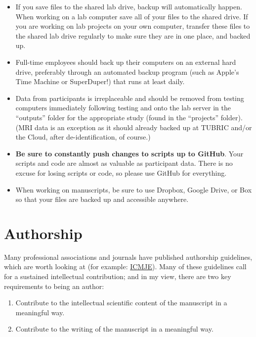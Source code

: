 \documentclass[letterpaper,12pt,oneside]{memoir}
\begin{document}
{\begin{itemize}
\item If you save files to the shared lab drive, backup will automatically happen. When working on a lab computer save all of your files to the shared drive. If you are working on lab projects on your own computer, transfer these files to the shared lab drive regularly to make sure they are in one place, and backed up.
\item Full-time employees should back up their computers on an external hard drive, preferably through an automated backup program (such as Apple's Time Machine or SuperDuper!) that runs at least daily.
\item Data from participants is irreplaceable and should be removed from testing computers immediately following testing and onto the lab server in the ``outputs'' folder for the appropriate study (found in the ``projects'' folder). (MRI data is an exception as it should already backed up at TUBRIC and/or the Cloud, after de-identification, of course.)
\item \textbf{Be sure to constantly push changes to scripts up to GitHub}. Your scripts and code are almost as valuable as participant data. There is no excuse for losing scripts or code, so please use GitHub for everything.
\item When working on manuscripts, be sure to use Dropbox, Google Drive, or Box so that your files are backed up and accessible anywhere.
\end{itemize}


\section{Authorship}
Many professional associations and journals have published authorship guidelines, which are worth looking at (for example: \href{http://www.icmje.org/recommendations/browse/roles-and-responsibilities/defining-the-role-of-authors-and-contributors.html}{ICMJE}). Many of these guidelines call for a sustained intellectual contribution; and in my view, there are two key requirements to being an author:

\begin{enumerate}
\item Contribute to the intellectual scientific content of the manuscript in a meaningful way.
\item Contribute to the writing of the manuscript in a meaningful way.
\end{enumerate}

}
\end{document}

